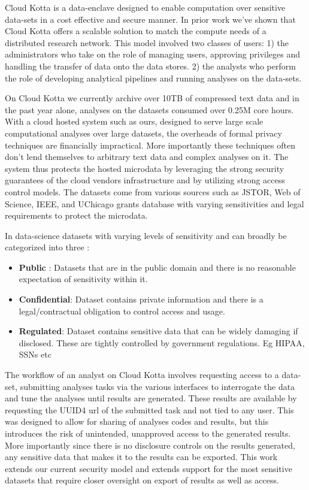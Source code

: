 Cloud Kotta is a data-enclave designed to enable computation over sensitive data-sets
in a cost effective and secure manner. In prior work we've shown that Cloud Kotta offers
a scalable solution to match the compute needs of a distributed research network.
This model involved two classes of users: 1) the administrators who take on the role of managing
users, approving privileges and handling the transfer of data onto the data stores. 2) the analysts
who perform the role of developing analytical pipelines and running analyses on the data-sets.

On Cloud Kotta we currently archive over 10TB of compressed text data and in the past year
alone, analyses on the datasets consumed over 0.25M core hours. With a cloud hosted system
such as ours, designed to serve large scale computational analyses over large datasets,
the overheads of formal privacy techniques are financially impractical. More importantly
these techniques often don't lend themselves to arbitrary text data and complex analyses
on it. The system thus protects the hosted microdata by leveraging the strong security
guarantees of the cloud vendors infrastructure and by utilizing strong access control
models. The datasets come from various sources such as JSTOR, Web of Science, IEEE,
and UChicago grants database with varying sensitivities and legal requirements to
protect the microdata.

In data-science datasets with varying levels of sensitivity and can broadly be
categorized into three \cite{ist_dataclass} :
\begin{itemize}
\item \textbf{Public} : Datasets that are in the public domain and there is no
  reasonable expectation of sensitivity within it.
\item \textbf{Confidential}: Dataset contains private information and there is a legal/contractual obligation to control access and usage.
\item \textbf {Regulated}: Dataset contains sensitive data that can be widely damaging if disclosed.
  These are tightly controlled by government regulations. Eg HIPAA, SSNs etc
\end{itemize}

The workflow of an analyst on Cloud Kotta involves requesting access to a data-set, submitting analyses
tasks via the various interfaces to interrogate the data and tune the analyses until results are generated.
These results are available by requesting the UUID4 url of the submitted task and not tied to any user.
This was designed to allow for sharing of analyses codes and results, but this introduces the risk
of unintended, unapproved access to the generated results. More importantly since there is no disclosure
controls on the results generated, any sensitive data that makes it to the results can be exported.
This work extends our current security model and extends support for the most sensitive datasets
that require closer oversight on export of results as well as access.

